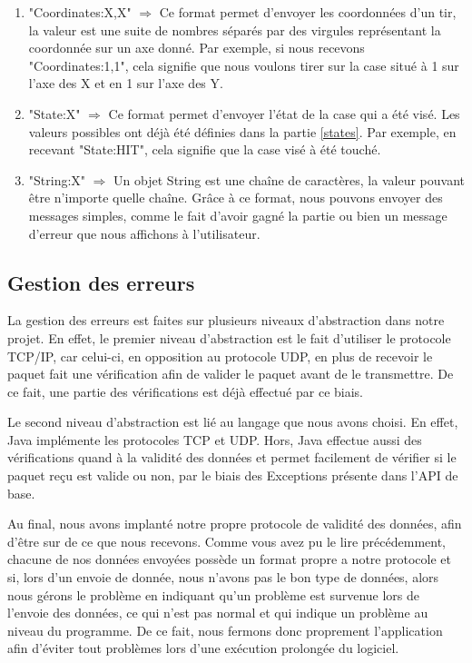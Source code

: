 			\begin{enumerate}
				\item "Coordinates:X,X" $\Rightarrow$ Ce format permet d'envoyer les coordonnées d'un tir, la valeur est une suite de nombres séparés par des virgules représentant la coordonnée sur un axe donné. Par exemple, si nous recevons "Coordinates:1,1", cela signifie que nous voulons tirer sur la case situé à 1 sur l'axe des X et en 1 sur l'axe des Y.
			 
				\item "State:X" $\Rightarrow$ Ce format permet d'envoyer l'état de la case qui a été visé. Les valeurs possibles ont déjà été définies dans la partie \ref{states}. Par exemple, en recevant "State:HIT", cela signifie que la case visé à été touché.
				
				\item "String:X" $\Rightarrow$ Un objet String est une chaîne de caractères, la valeur pouvant être n'importe quelle chaîne. Grâce à ce format, nous pouvons envoyer des messages simples, comme le fait d'avoir gagné la partie ou bien un message d'erreur que nous affichons à l'utilisateur. 
				
			\end{enumerate}
			

\subsection{Gestion des erreurs}
	La gestion des erreurs est faites sur plusieurs niveaux d'abstraction dans notre projet. En effet, le premier niveau d'abstraction est le fait d'utiliser le protocole TCP/IP, car celui-ci, en opposition au protocole UDP, en plus de recevoir le paquet fait une vérification afin de valider le paquet avant de le transmettre. De ce fait, une partie des vérifications est déjà effectué par ce biais.\newline
	
	Le second niveau d'abstraction est lié au langage que nous avons choisi. En effet, Java implémente les protocoles TCP et UDP. Hors, Java effectue aussi des vérifications quand à la validité des données et permet facilement de vérifier si le paquet reçu est valide ou non, par le biais des Exceptions présente dans l'API de base.\newline
	
	Au final, nous avons implanté notre propre protocole de validité des données, afin d'être sur de ce que nous recevons. Comme vous avez pu le lire précédemment, chacune de nos données envoyées possède un format propre a notre protocole et si, lors d'un envoie de donnée, nous n'avons pas le bon type de données, alors nous gérons le problème en indiquant qu'un problème est survenue lors de l'envoie des données, ce qui n'est pas normal et qui indique un problème au niveau du programme. De ce fait, nous fermons donc proprement l'application afin d'éviter tout problèmes lors d'une exécution prolongée du logiciel.\newline
	
